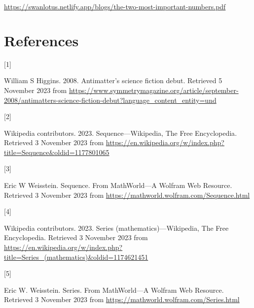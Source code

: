 \documentclass[
  a4paper,
]{article}
\newlength{\cslhangindent}
\newlength{\csllabelwidth}
\newlength{\cslentryspacingunit} %
\newenvironment{CSLReferences}[2] %
 {%
  \setlength{\parindent}{0pt}
  \ifodd #1
  \let\oldpar\par
  \def\par{\hangindent=\cslhangindent\oldpar}
  \fi
  \setlength{\parskip}{#2\cslentryspacingunit}
 }%
 {}
\newcommand{\CSLLeftMargin}[1]{\parbox[t]{\csllabelwidth}{#1}}
\newcommand{\CSLRightInline}[1]{\parbox[t]{\linewidth - \csllabelwidth}{#1}\break}
\begin{document}
\begin{small}

\begin{sffamily}

\url{https://swanlotus.netlify.app/blogs/the-two-most-important-numbers.pdf}

\end{sffamily}

\end{small}

\hypertarget{bibliography}{%
\section*{References}\label{bibliography}}

\hypertarget{refs}{}
\begin{CSLReferences}{0}{0}
\leavevmode{}%
\CSLLeftMargin{{[}1{]} }%
\CSLRightInline{William S Higgins. 2008. {Antimatter's science fiction
debut}. Retrieved 5 November 2023 from
\url{https://www.symmetrymagazine.org/article/september-2008/antimatters-science-fiction-debut?language_content_entity=und}}

\leavevmode{}%
\CSLLeftMargin{{[}2{]} }%
\CSLRightInline{Wikipedia contributors. 2023. {Sequence---{Wikipedia}{,}
The Free Encyclopedia}. Retrieved 3 November 2023 from
\url{https://en.wikipedia.org/w/index.php?title=Sequence\&oldid=1177801065}}

\leavevmode{}%
\CSLLeftMargin{{[}3{]} }%
\CSLRightInline{Eric W Weisstein. {Sequence. From MathWorld---A Wolfram
Web Resource}. Retrieved 3 November 2023 from
\url{https://mathworld.wolfram.com/Sequence.html}}

\leavevmode{}%
\CSLLeftMargin{{[}4{]} }%
\CSLRightInline{Wikipedia contributors. 2023. {Series
(mathematics)---{Wikipedia}{,} The Free Encyclopedia}. Retrieved 3
November 2023 from
\url{https://en.wikipedia.org/w/index.php?title=Series_(mathematics)\&oldid=1174621451}}

\leavevmode{}%
\CSLLeftMargin{{[}5{]} }%
\CSLRightInline{Eric W. Weisstein. {Series. From MathWorld---A Wolfram
Web Resource}. Retrieved 3 November 2023 from
\url{https://mathworld.wolfram.com/Series.html}}

\end{CSLReferences}
\end{document}
